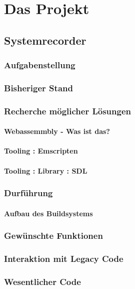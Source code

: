 \chapter{Das Projekt}

\section{Systemrecorder}
\subsection{Aufgabenstellung}
\subsection{Bisheriger Stand}
\subsection{Recherche möglicher Lösungen}
\subsubsection{Webassemmbly - Was ist das?}
\subsubsection{Tooling : Emscripten}
\subsubsection{Tooling : Library : SDL}
\subsection{Durführung}
\subsubsection{Aufbau des Buildsystems}
\subsection{Gewünschte Funktionen}
\subsection{Interaktion mit Legacy Code}
\subsection{Wesentlicher Code}

